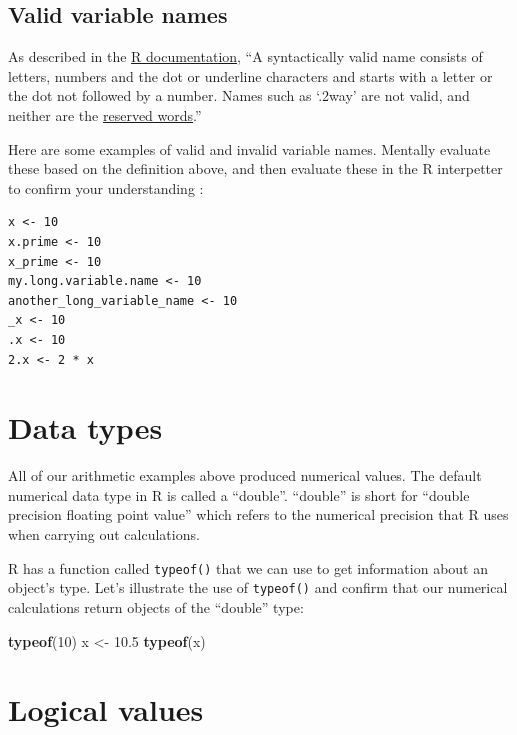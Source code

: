 \documentclass[]{book}
\newenvironment{Shaded}{\begin{snugshade}}{\end{snugshade}}
\newcommand{\DecValTok}[1]{\textcolor[rgb]{0.00,0.00,0.81}{#1}}
\newcommand{\FloatTok}[1]{\textcolor[rgb]{0.00,0.00,0.81}{#1}}
\newcommand{\KeywordTok}[1]{\textcolor[rgb]{0.13,0.29,0.53}{\textbf{#1}}}
\newcommand{\NormalTok}[1]{#1}
\newcommand{\StringTok}[1]{\textcolor[rgb]{0.31,0.60,0.02}{#1}}
\theoremstyle{definition}
\theoremstyle{definition}
\theoremstyle{definition}
\theoremstyle{remark}
\begin{document}
\hypertarget{valid-variable-names}{%
\subsection{Valid variable names}\label{valid-variable-names}}

As described in the
\href{https://stat.ethz.ch/R-manual/R-devel/library/base/html/make.names.html}{R
documentation}, ``A syntactically valid name consists of letters,
numbers and the dot or underline characters and starts with a letter or
the dot not followed by a number. Names such as `.2way' are not valid,
and neither are the
\href{https://stat.ethz.ch/R-manual/R-devel/library/base/html/Reserved.html}{reserved
words}.''

Here are some examples of valid and invalid variable names. Mentally
evaluate these based on the definition above, and then evaluate these in
the R interpetter to confirm your understanding :

\begin{verbatim}
x <- 10
x.prime <- 10
x_prime <- 10
my.long.variable.name <- 10
another_long_variable_name <- 10
_x <- 10
.x <- 10
2.x <- 2 * x
\end{verbatim}

\hypertarget{data-types}{%
\section{Data types}\label{data-types}}

All of our arithmetic examples above produced numerical values. The
default numerical data type in R is called a ``double''. ``double'' is
short for ``double precision floating point value'' which refers to the
numerical precision that R uses when carrying out calculations.

R has a function called \texttt{typeof()} that we can use to get
information about an object's type. Let's illustrate the use of
\texttt{typeof()} and confirm that our numerical calculations return
objects of the ``double'' type:

\begin{Shaded}
\begin{Highlighting}[]
\KeywordTok{typeof}\NormalTok{(}\DecValTok{10}\NormalTok{)}
\NormalTok{x <-}\StringTok{ }\FloatTok{10.5}
\KeywordTok{typeof}\NormalTok{(x)}
\end{Highlighting}
\end{Shaded}

\hypertarget{logical-values}{%
\section{Logical values}\label{logical-values}}
\end{document}
